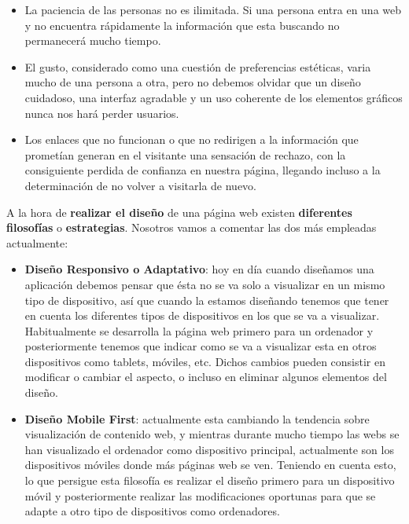 \begin{itemize}
    \item La paciencia de las personas no es ilimitada. Si una persona entra en una web y no encuentra rápidamente la información que esta buscando no permanecerá mucho tiempo.
    \item El gusto, considerado como una cuestión de preferencias estéticas, varia mucho de una persona a otra, pero no debemos olvidar que un diseño cuidadoso, una interfaz agradable y un uso coherente de los elementos gráficos nunca nos hará perder usuarios.
    \item Los enlaces que no funcionan o que no redirigen a la información que prometían generan en el visitante una sensación de rechazo, con la consiguiente perdida de confianza en nuestra página, llegando incluso a la determinación de no volver a visitarla de nuevo.
\end{itemize}

A la hora de \textbf{realizar el diseño} de una página web existen \textbf{diferentes filosofías} o \textbf{estrategias}. Nosotros vamos a comentar las dos más empleadas actualmente:

\begin{itemize}
    \item \textbf{Diseño Responsivo o Adaptativo}: hoy en día cuando diseñamos una aplicación debemos pensar que ésta no se va solo a visualizar en un mismo tipo de dispositivo, así que cuando la estamos diseñando tenemos que tener en cuenta los diferentes tipos de dispositivos en los que se va a visualizar. Habitualmente se desarrolla la página web primero para un ordenador y posteriormente tenemos que indicar como se va a visualizar esta en otros dispositivos como tablets, móviles, etc. Dichos cambios pueden consistir en modificar o cambiar el aspecto, o incluso en eliminar algunos elementos del diseño.

    \item \textbf{Diseño Mobile First}: actualmente esta cambiando la tendencia sobre visualización de contenido web, y mientras durante mucho tiempo las webs se han visualizado el ordenador como dispositivo principal, actualmente son los dispositivos móviles donde más páginas web se ven. Teniendo en cuenta esto, lo que persigue esta filosofía es realizar el diseño primero para un dispositivo móvil y posteriormente realizar las modificaciones oportunas para que se adapte a otro tipo de dispositivos como ordenadores.
\end{itemize}

